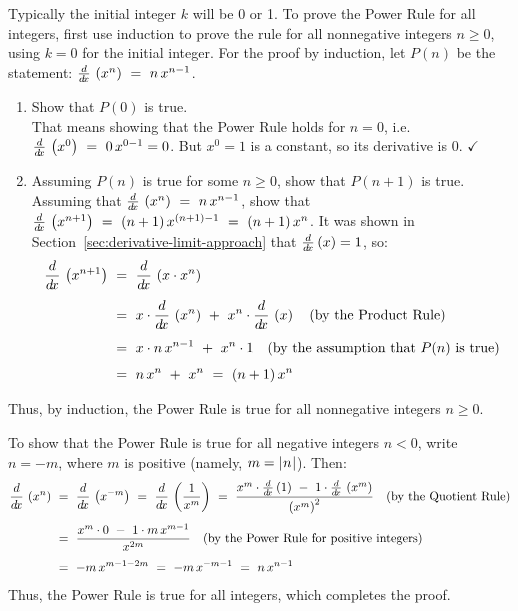 Typically the initial integer $k$ will be 0 or 1. To prove the Power Rule for
all integers, first use induction to prove the rule for all nonnegative integers
$n \ge 0$, using $k = 0$ for the initial integer. For the proof by induction,
let $P(n)$ be the statement: $\frac{d}{d\!x}\,\left(x^n\right) ~=~ n\,x^{n-1}$.
\begin{enumerate}
 \item Show that $P(0)$ is true.\\That means showing that the Power
  Rule holds for $n = 0$, i.e. $\frac{d}{d\!x}\,\left(x^0\right) ~=~ 0\,x^{0-1} = 0$.
  But $x^0 = 1$ is a constant, so its derivative is 0. $\checkmark$
 \item Assuming $P(n)$ is true for some $n \ge 0$, show that $P(n+1)$ is true.\\Assuming
 that $\frac{d}{d\!x}\,\left(x^n\right) ~=~ n\,x^{n-1}$, show that
 $\frac{d}{d\!x}\,\left(x^{n+1}\right) ~=~ (n + 1)\,x^{(n+1)-1} ~=~ (n + 1)\,x^n$. It was
 shown in Section~\ref{sec:derivative-limit-approach} that $\frac{d}{d\!x}\,(x) = 1$, so:
 \begin{align*}
  \frac{d}{d\!x}\,\left(x^{n+1}\right) ~&=~ \frac{d}{d\!x}\,\left( x \cdot x^n \right)\\[4pt]
  &=~ x \cdot \frac{d}{d\!x}\,\left(x^n\right) ~+~ x^n \cdot \frac{d}{d\!x}\,\left(x\right) \quad\text{(by the Product Rule)}\\[4pt]
  &=~ x \cdot n\,x^{n-1} ~+~ x^n \cdot 1 \quad\text{(by the assumption that $P(n)$ is true)}\\[4pt]
  &=~ n\,x^n ~+~ x^n ~=~ (n + 1)\,x^n \quad\relax
 \end{align*}
\end{enumerate}\vspace{-5mm}
\noindent Thus, by induction, the Power Rule is true for all nonnegative
integers $n \ge 0$.

To show that the Power Rule is true for all negative integers $n < 0$, write
$n = -m$, where $m$ is positive (namely, $m = \lvert\mspace{1mu}n\mspace{1mu}\rvert$). Then:
\begin{align*}
 \frac{d}{d\!x}\,\left(x^n\right) ~&=~ \frac{d}{d\!x}\,\left(x^{-m}\right) ~=~ \frac{d}{d\!x}\,\left(\frac{1}{x^m}\right) ~=~
  \frac{x^m \cdot \frac{d}{d\!x}\,(1) ~-~ 1 \cdot \frac{d}{d\!x}\,\left(x^m\right)}{\left(x^m\right)^2}
  \quad\text{(by the Quotient Rule)}\\[4pt]
 &=~ \frac{x^m \cdot 0 ~-~ 1 \cdot m\,x^{m-1}}{x^{2m}} \quad\text{(by the Power Rule for positive integers)}\\[4pt]
 &=~ -m\,x^{m-1-2m} ~=~ -m\,x^{-m-1} ~=~ n\,x^{n-1} \quad\relax
\end{align*}
Thus, the Power Rule is true for all integers, which completes the proof. \qedsymbol


